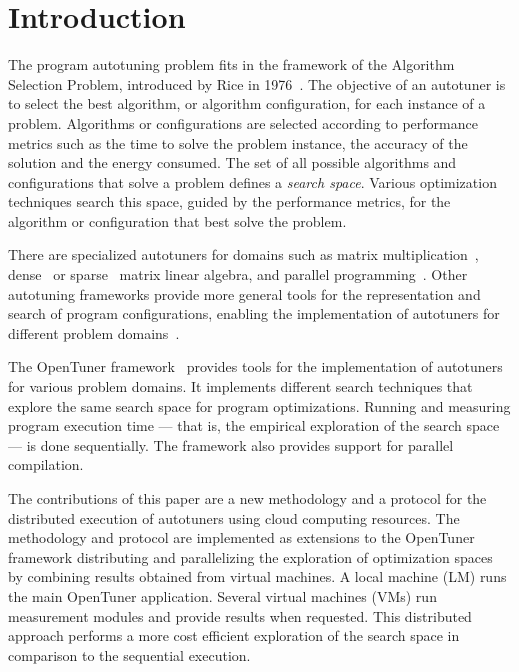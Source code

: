 \section{Introduction} \label{sec:intro}

The program autotuning problem fits in the framework of the Algorithm Selection
Problem, introduced by Rice in 1976~\cite{rice1976algorithm}. The objective of
an autotuner is to select the best algorithm, or algorithm configuration, for
each instance of a problem.  Algorithms or configurations are selected
according to performance metrics such as the time to solve the problem
instance, the accuracy of the solution and the energy consumed.  The set of all
possible algorithms and configurations that solve a problem defines a
\emph{search space}. Various optimization techniques search this space, guided
by the performance metrics, for the algorithm or configuration that best solve
the problem.

There are specialized autotuners for domains such as matrix
multiplication~\cite{bilmes1997phipac}, dense~\cite{whaley1998atlas} or
sparse~\cite{vuduc2005oski} matrix linear algebra, and parallel
programming~\cite{jordan2012multi}. Other autotuning frameworks provide more
general tools for the representation and search of program configurations,
enabling the implementation of autotuners for different problem
domains~\cite{ansel2014opentuner,hutter2009paramils}.

The OpenTuner framework~\cite{ansel2014opentuner} provides tools for the
implementation of autotuners for various problem domains. It implements
different search techniques that explore the same search space for program
optimizations.
Running and measuring program execution time --- that is, the empirical
exploration of the search space --- is done sequentially.
The framework also provides support for parallel compilation.

The contributions of this paper are a new methodology and a protocol for the
distributed execution of autotuners using cloud computing resources.  The
methodology and protocol are implemented as extensions to the OpenTuner
framework distributing and parallelizing the exploration of optimization spaces
by combining results obtained from virtual machines.  A local machine (LM) runs
the main OpenTuner application. Several virtual machines (VMs) run measurement
modules and provide results when requested. This distributed approach performs
a more cost efficient exploration of the search space in comparison to the
sequential execution.

